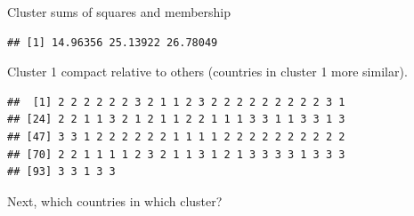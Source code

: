 \begin{frame}[fragile]{Cluster sums of squares and membership}
  
\begin{knitrout}
\color{fgcolor}\begin{kframe}
\begin{alltt}
\hlopt{$}
\end{alltt}
\begin{verbatim}
## [1] 14.96356 25.13922 26.78049
\end{verbatim}
\end{kframe}
\end{knitrout}

Cluster 1 compact relative to others (countries in cluster 1  more similar).

\begin{knitrout}
\color{fgcolor}\begin{kframe}
\begin{alltt}
\hlopt{$}
\end{alltt}
\begin{verbatim}
##  [1] 2 2 2 2 2 2 3 2 1 1 2 3 2 2 2 2 2 2 2 2 2 3 1
## [24] 2 2 1 1 3 2 1 2 1 1 2 2 1 1 1 3 3 1 1 3 3 1 3
## [47] 3 3 1 2 2 2 2 2 2 1 1 1 1 2 2 2 2 2 2 2 2 2 2
## [70] 2 2 1 1 1 1 2 3 2 1 1 3 1 2 1 3 3 3 3 1 3 3 3
## [93] 3 3 1 3 3
\end{verbatim}
\begin{alltt}
\hlopt{$}\hlkwb{=}\hlopt{$}
\end{alltt}
\end{kframe}
\end{knitrout}

Next, which countries in which cluster?

  
\end{frame}


